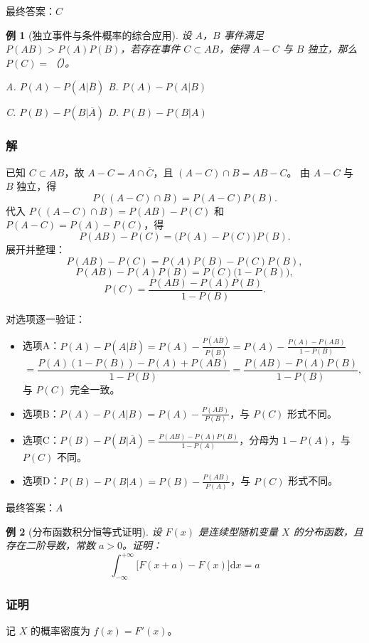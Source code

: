 \documentclass[11pt,a4paper,oneside,openany]{book}
\theoremstyle{yhbthm}
\newtheorem{example}{例}[section]
\begin{document}
最终答案：$\boxed{C}$

\begin{example}[独立事件与条件概率的综合应用]
设 $A$，$B$ 事件满足 $P(AB) > P(A)P(B)$，若存在事件 $C \subset AB$，使得 $A-C$ 与 $B$ 独立，那么 $P(C)=$（）。

A. $P(A) - P(A|\overline{B})$ \quad\quad B. $P(A) - P(A|B)$

C. $P(B) - P(B|\overline{A})$ \quad\quad D. $P(B) - P(B|A)$
\end{example}

\subsubsection{解}
已知 $C \subset AB$，故 $A-C = A \cap \overline{C}$，且 $(A-C) \cap B = AB - C$。
由 $A-C$ 与 $B$ 独立，得
\[
P((A-C) \cap B) = P(A-C)P(B).
\]
代入 $P((A-C) \cap B) = P(AB) - P(C)$ 和 $P(A-C) = P(A) - P(C)$，得
\[
P(AB) - P(C) = \bigl(P(A) - P(C)\bigr)P(B).
\]
展开并整理：
\[
P(AB) - P(C) = P(A)P(B) - P(C)P(B),
\]
\[
P(AB) - P(A)P(B) = P(C)\bigl(1 - P(B)\bigr),
\]
\[
P(C) = \frac{P(AB) - P(A)P(B)}{1 - P(B)}.
\]

对选项逐一验证：
\begin{itemize}
  \item 选项A：$P(A) - P(A|\overline{B}) = P(A) - \frac{P(A\overline{B})}{P(\overline{B})} = P(A) - \frac{P(A) - P(AB)}{1 - P(B)}$
  \[
  = \frac{P(A)(1 - P(B)) - P(A) + P(AB)}{1 - P(B)} = \frac{P(AB) - P(A)P(B)}{1 - P(B)},
  \]
  与 $P(C)$ 完全一致。
  \item 选项B：$P(A) - P(A|B) = P(A) - \frac{P(AB)}{P(B)}$，与 $P(C)$ 形式不同。
  \item 选项C：$P(B) - P(B|\overline{A}) = \frac{P(AB) - P(A)P(B)}{1 - P(A)}$，分母为 $1 - P(A)$，与 $P(C)$ 不同。
  \item 选项D：$P(B) - P(B|A) = P(B) - \frac{P(AB)}{P(A)}$，与 $P(C)$ 形式不同。
\end{itemize}

最终答案：$\boxed{A}$

\begin{example}[分布函数积分恒等式证明]
设 $F(x)$ 是连续型随机变量 $X$ 的分布函数，且存在二阶导数，常数 $a>0$。证明：
\[
\int_{-\infty}^{+\infty} \bigl[F(x+a) - F(x)\bigr] \mathrm{d}x = a
\]
\end{example}

\subsubsection{证明}
记 $X$ 的概率密度为 $f(x) = F'(x)$。
\end{document}
